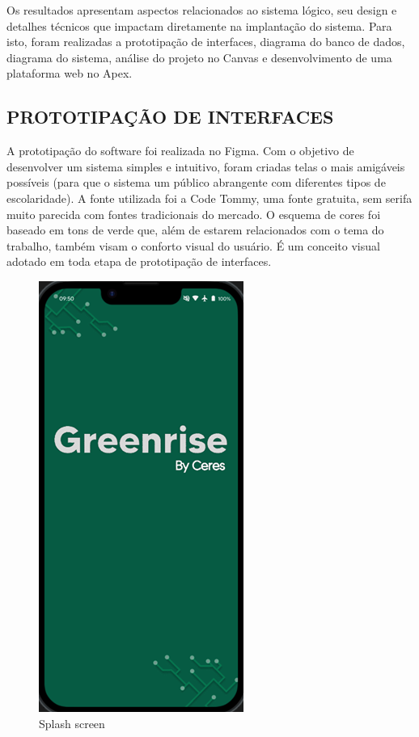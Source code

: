Os resultados apresentam aspectos relacionados ao sistema lógico, seu design e detalhes técnicos que impactam diretamente na implantação do sistema. Para isto, foram realizadas a prototipação de interfaces, diagrama do banco de dados, diagrama do sistema, análise do projeto no Canvas e desenvolvimento de uma plataforma web no Apex.

\subsection*{PROTOTIPAÇÃO DE INTERFACES}

A prototipação do software foi realizada no Figma. Com o objetivo de desenvolver um sistema simples e intuitivo, foram criadas telas o mais amigáveis possíveis (para que o sistema um público abrangente com diferentes tipos de escolaridade). A fonte utilizada foi a Code Tommy, uma fonte gratuita, sem serifa muito parecida com fontes tradicionais do mercado. O esquema de cores foi baseado em tons de verde que, além de estarem relacionados com o tema do trabalho, também visam o conforto visual do usuário. É um conceito visual adotado em toda etapa de prototipação de interfaces.

\begin{figure}[!h]
\centering
\caption{Splash screen}%
\label{fig:picture1}
\includegraphics[scale=1]{Illustrations/Picture1.png}
\end{figure}


